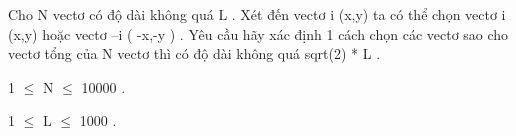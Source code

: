 Cho N vectơ có độ dài không quá L . Xét đến vectơ i (x,y) ta có thể chọn vectơ i (x,y) hoặc vectơ –i ( -x,-y ) . Yêu cầu hãy xác định 1 cách chọn các vectơ sao cho vectơ tổng của N vectơ thì có độ dài không quá sqrt(2) * L .   


   1  $\le$  N  $\le$  10000 .   


   1  $\le$  L  $\le$  1000 .